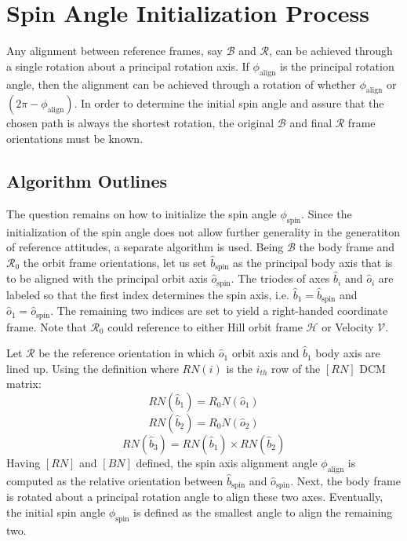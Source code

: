 \documentclass[]{AVSSimReportMemo}
\begin{document}
\section{Spin Angle Initialization Process}
Any alignment between reference frames, say $\mathcal{B}$ and $\mathcal{R}$, can be achieved through a single rotation about a principal rotation axis. If $\phi_{\textrm{align}}$ is the principal rotation angle, then the alignment can be achieved through a rotation of whether $\phi_{\textrm{align}}$ or $( 2\pi - \phi_{\textrm{align}})$. In order to determine the initial spin angle and assure that the chosen path is always the shortest rotation, the original $\mathcal{B}$ and final $\mathcal{R}$ frame orientations must be known.\par

\subsection{Algorithm Outlines}
The question remains on how to initialize the spin angle $\phi_{\textrm{spin}}$. Since the initialization of the spin angle does not allow further generality in the generatiton of reference attitudes, a separate algorithm is used.
Being $\mathcal{B}$ the body frame and $\mathcal{R}_{0}$ the orbit frame orientations, let us set $\hat{b}_{\textrm{spin}}$ as the principal body axis that is to be aligned with the principal orbit axis $\hat{o}_{\textrm{spin}}$. The triodes of axes $\hat b_{i}$ and $\hat o_{i}$ are labeled so that the first index determines the spin axis, i.e. $\hat b_{1} =\hat b_{\textrm{spin}}$ and $\hat o_{1} =\hat o_{\textrm{spin}}$. The remaining two indices are set to yield a right-handed coordinate frame. Note that $\mathcal{R}_{0}$ could reference to either Hill orbit frame $\mathcal{H}$ or Velocity $\mathcal{V}$.\par

Let $\mathcal{R}$ be the reference orientation in which $\hat o_{1}$ orbit axis and $\hat b_{1}$ body axis are lined up. Using the definition where $RN(i)$ is the $i_{th}$ row of the $[RN]$ DCM matrix:
\begin{equation}
	\label{eq:dbeta}
	RN(\hat b_{1}) = R_{0}N(\hat o_{1}) 
\end{equation}
\begin{equation}
	\label{eq:dbeta}
	RN(\hat b_{2}) = R_{0}N(\hat o_{2}) 
\end{equation}
\begin{equation}
	\label{eq:dbeta}
	RN(\hat b_{3}) = RN(\hat b_{1}) \times RN(\hat b_{2})
\end{equation}
Having $[RN]$ and $[BN]$ defined, the spin axis alignment angle $\phi_{\textrm{align}}$ is computed as the relative orientation between $\hat b_{\textrm{spin}}$ and $\hat o_{\textrm{spin}}$. Next, the body frame is rotated about a principal rotation angle to align these two axes. Eventually, the initial spin angle $\phi_{\textrm{spin}}$ is defined as the smallest angle to align the remaining two.



\end{document}
